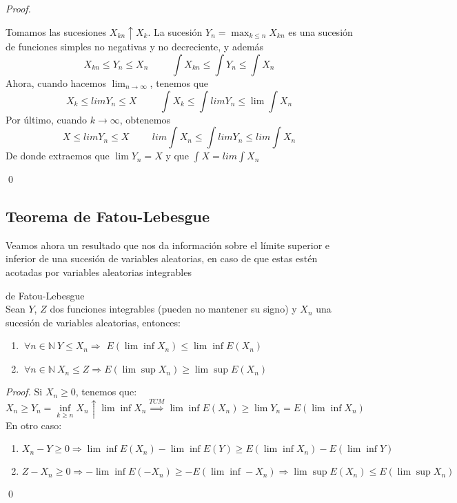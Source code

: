 \begin{proof}
\

Tomamos las sucesiones $X_{kn} \uparrow X_k$. La sucesión $Y_n = \displaystyle \max_{k \leq n} X_{kn}$ es una sucesión de funciones simples no negativas y no decreciente, y además
$$X_{kn} \leq Y_n \leq X_n 
\hspace{1cm}
\int X_{kn} \leq \int Y_n \leq \int X_n$$
Ahora, cuando hacemos $\lim_{n \rightarrow \infty}$, tenemos que
$$X_k \leq lim Y_n \leq X 
\hspace{1cm}
\int X_k \leq \int lim Y_n \leq \lim \int X_n$$
Por último, cuando $k \rightarrow \infty$, obtenemos
$$X \leq lim Y_n \leq X 
\hspace{1cm}
lim \int X_n \leq \int lim Y_n \leq lim \int X_n$$
De donde extraemos que $\lim Y_n = X$ y que $\displaystyle \int X = lim \int X_n$

\qed
\end{proof}

\subsection{Teorema de Fatou-Lebesgue}
Veamos ahora un resultado que nos da información sobre el límite superior e inferior de una sucesión de variables aleatorias, en caso de que estas estén acotadas por variables aleatorias integrables

\begin{theorem}
de Fatou-Lebesgue\\

Sean $Y$, $Z$ dos funciones integrables (pueden no mantener su signo) y $X_n$ una sucesión de variables aleatorias, entonces:
\begin{enumerate}
\item $\ \forall n\in\mathbb{N} \ Y \leq X_n \Longrightarrow$ $E(\lim \inf X_n) \leq \lim \inf E(X_n)$
\item $\ \forall n\in\mathbb{N}\ X_n \leq Z \Longrightarrow E(\lim \sup X_n)\geq \lim \sup E(X_n)$
\end{enumerate}
\end{theorem}

\begin{proof}
Si $X_n \geq 0$, tenemos que:
$$ X_n \geq Y_n = \inf_{k \geq n} X_n \uparrow \lim \inf X_n \stackrel{TCM}{\implies} \lim \inf E(X_n) \geq \lim Y_n = E(\lim \inf X_n)$$
En otro caso:
\begin{enumerate}
\item $X_n - Y \geq 0 \Rightarrow \lim \inf E(X_n) - \lim \inf E(Y) \geq E(\lim \inf X_n) - E(\lim \inf Y)$
\item $Z - X_n \geq 0 \Rightarrow - \lim \inf E(-X_n) \geq - E(\lim \inf - X_n) \Rightarrow \lim \sup E(X_n) \leq E(\lim \sup X_n)$
\end{enumerate}
\qed
\end{proof}

